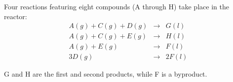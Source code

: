 Four reactions featuring eight compounds (A through H) take place in the reactor:
\begin{eqnarray}
A(g) + C(g) + D(g) & \rightarrow & G(l) \\
A(g) + C(g) + E(g) & \rightarrow & H(l) \\
A(g) + E(g)        & \rightarrow & F(l) \\
3D(g)              & \rightarrow & 2F(l) 
\label{eq:te-reaction}
\end{eqnarray}

G and H are the first and second products, while F is a byproduct.


